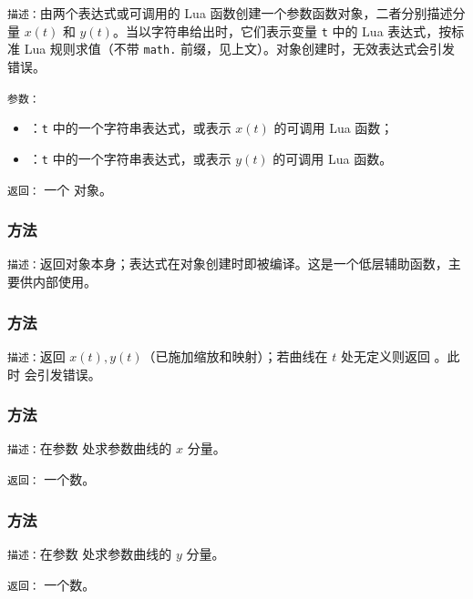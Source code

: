 \texttt{描述：}由两个表达式或可调用的 Lua 函数创建一个参数函数对象，二者分别描述分量 $x(t)$ 和 $y(t)$。当以字符串给出时，它们表示变量 \texttt{t} 中的 Lua 表达式，按标准 Lua 规则求值（不带 \texttt{math.} 前缀，见上文）。对象创建时，无效表达式会引发错误。

\texttt{参数：}\par
\begin{itemize}
\item {}：\texttt{t} 中的一个字符串表达式，或表示 $x(t)$ 的可调用 Lua 函数；
\item {}：\texttt{t} 中的一个字符串表达式，或表示 $y(t)$ 的可调用 Lua 函数。
\end{itemize}

\texttt{返回：} 一个  对象。

\subsubsection{方法 }
\label{ssub:method_pfct_compile}

\texttt{描述：}返回对象本身；表达式在对象创建时即被编译。这是一个低层辅助函数，主要供内部使用。

\subsubsection{方法 }
\label{ssub:method_pfct_eval}

\texttt{描述：}返回 $x(t), y(t)$（已施加缩放和映射）；若曲线在 $t$ 处无定义则返回 。此时  会引发错误。


\subsubsection{方法 }
\label{ssub:method_pfct_x}

\texttt{描述：}在参数  处求参数曲线的 $x$ 分量。

\medskip
\texttt{返回：} 一个数。

\subsubsection{方法 }
\label{ssub:method_pfct_y}

\texttt{描述：}在参数  处求参数曲线的 $y$ 分量。

\medskip
\texttt{返回：} 一个数。

